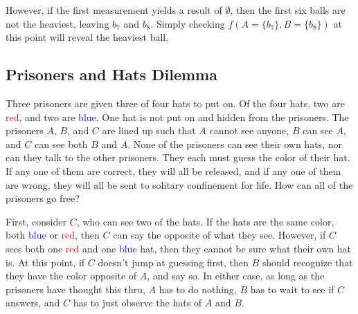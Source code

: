 \documentclass[12pt]{article}
\begin{document}
	However, if the first measurement yields a result of $\emptyset$, then the first six balls are not the heaviest, leaving $b_7$ and $b_8$. Simply checking $f(A = \{b_7\}, B = \{b_8\})$ at this point will reveal the heaviest ball.

	\subsection{Prisoners and Hats Dilemma}
	Three prisoners are given three of four hats to put on. Of the four hats, two are \textcolor{red}{red}, and two are \textcolor{blue}{blue}. One hat is not put on and hidden from the prisoners. The prisoners $A$, $B$, and $C$ are lined up such that $A$ cannot see anyone, $B$ can see $A$, and $C$ can see both $B$ and $A$. None of the prisoners can see their own hats, nor can they talk to the other prisoners. They each must guess the color of their hat. If any one of them are correct, they will all be released, and if any one of them are wrong, they will all be sent to solitary confinement for life. How can all of the prisoners go free? \linebreak

	First, consider $C$, who can see two of the hats. If the hats are the same color, both \textcolor{blue}{blue} or \textcolor{red}{red}, then $C$ can say the opposite of what they see. However, if $C$ sees both one \textcolor{red}{red} and one \textcolor{blue}{blue} hat, then they cannot be sure what their own hat is. At this point, if $C$ doesn't jump at guessing first, then $B$ should recognize that they have the color opposite of $A$, and say so. In either case, as long as the prisoners have thought this thru, $A$ has to do nothing, $B$ has to wait to see if $C$ answers, and $C$ has to just observe the hats of $A$ and $B$.
\end{document}
